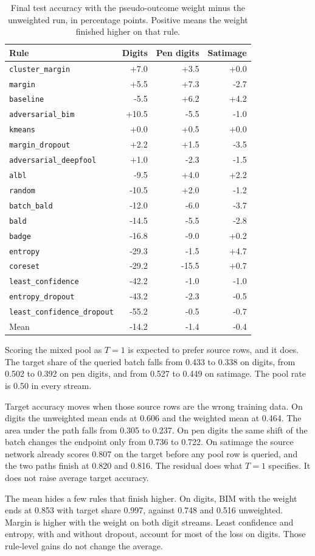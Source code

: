 \documentclass[11pt]{article}
\begin{document}
\begin{table}[H]
\centering
\caption{Final test accuracy with the pseudo-outcome weight minus the unweighted run, in percentage points. Positive means the weight finished higher on that rule.}
\label{tab:po-weight-delta}
\begin{tabular}{lrrr}
\toprule
Rule & Digits & Pen digits & Satimage \\
\midrule
\texttt{cluster\_margin} & +7.0 & +3.5 & +0.0 \\
\texttt{margin} & +5.5 & +7.3 & -2.7 \\
\texttt{baseline} & -5.5 & +6.2 & +4.2 \\
\texttt{adversarial\_bim} & +10.5 & -5.5 & -1.0 \\
\texttt{kmeans} & +0.0 & +0.5 & +0.0 \\
\texttt{margin\_dropout} & +2.2 & +1.5 & -3.5 \\
\texttt{adversarial\_deepfool} & +1.0 & -2.3 & -1.5 \\
\texttt{albl} & -9.5 & +4.0 & +2.2 \\
\texttt{random} & -10.5 & +2.0 & -1.2 \\
\texttt{batch\_bald} & -12.0 & -6.0 & -3.7 \\
\texttt{bald} & -14.5 & -5.5 & -2.8 \\
\texttt{badge} & -16.8 & -9.0 & +0.2 \\
\texttt{entropy} & -29.3 & -1.5 & +4.7 \\
\texttt{coreset} & -29.2 & -15.5 & +0.7 \\
\texttt{least\_confidence} & -42.2 & -1.0 & -1.0 \\
\texttt{entropy\_dropout} & -43.2 & -2.3 & -0.5 \\
\texttt{least\_confidence\_dropout} & -55.2 & -0.5 & -0.7 \\
\midrule
Mean & -14.2 & -1.4 & -0.4 \\
\bottomrule
\end{tabular}
\end{table}

Scoring the mixed pool as $T=1$ is expected to prefer source rows, and it does. The target share of the queried batch falls from 0.433 to 0.338 on digits, from 0.502 to 0.392 on pen digits, and from 0.527 to 0.449 on satimage. The pool rate is 0.50 in every stream.

Target accuracy moves when those source rows are the wrong training data. On digits the unweighted mean ends at 0.606 and the weighted mean at 0.464. The area under the path falls from 0.305 to 0.237. On pen digits the same shift of the batch changes the endpoint only from 0.736 to 0.722. On satimage the source network already scores 0.807 on the target before any pool row is queried, and the two paths finish at 0.820 and 0.816. The residual does what $T=1$ specifies. It does not raise average target accuracy.

The mean hides a few rules that finish higher. On digits, BIM with the weight ends at 0.853 with target share 0.997, against 0.748 and 0.516 unweighted. Margin is higher with the weight on both digit streams. Least confidence and entropy, with and without dropout, account for most of the loss on digits. Those rule-level gains do not change the average.
\end{document}
